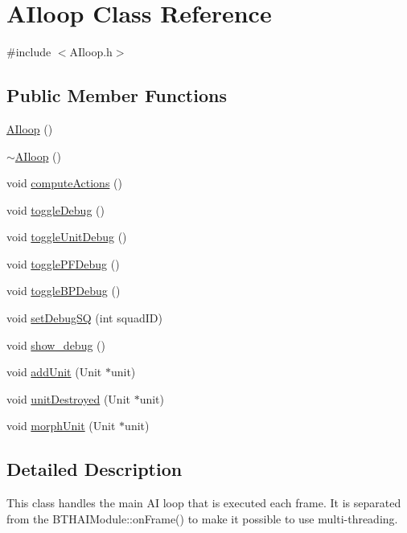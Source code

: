 \hypertarget{class_a_iloop}{\section{A\-Iloop Class Reference}
\label{class_a_iloop}
}


{\ttfamily \#include $<$A\-Iloop.\-h$>$}

\subsection*{Public Member Functions}
\begin{DoxyCompactItemize}
\item 
\hyperlink{class_a_iloop_a20217dd1458618fe080f78e51341dae4}{A\-Iloop} ()
\item 
\hyperlink{class_a_iloop_a8bc15ee25c29beeca460f7682f62d69a}{$\sim$\-A\-Iloop} ()
\item 
void \hyperlink{class_a_iloop_a801c656f08b869162aada7ea07acee7c}{compute\-Actions} ()
\item 
void \hyperlink{class_a_iloop_afefb108f23a44fb3d3476980f200bec7}{toggle\-Debug} ()
\item 
void \hyperlink{class_a_iloop_a7b3a52d22b2327b9a40b1dcbcbf47097}{toggle\-Unit\-Debug} ()
\item 
void \hyperlink{class_a_iloop_a1c37bca877bb6e97468076e4256763d1}{toggle\-P\-F\-Debug} ()
\item 
void \hyperlink{class_a_iloop_a770c5331543570b3554688af7d85099b}{toggle\-B\-P\-Debug} ()
\item 
void \hyperlink{class_a_iloop_a68a5eb0b37ed3bb02e02f39bc31a953e}{set\-Debug\-S\-Q} (int squad\-I\-D)
\item 
void \hyperlink{class_a_iloop_ad7fa805bcc3cb770b3c862780dd26c07}{show\-\_\-debug} ()
\item 
void \hyperlink{class_a_iloop_a27e674d2b42ab12f7b444a21619c0fb1}{add\-Unit} (Unit $\ast$unit)
\item 
void \hyperlink{class_a_iloop_a29a2d542b7ea41632e6f1a80d5265e59}{unit\-Destroyed} (Unit $\ast$unit)
\item 
void \hyperlink{class_a_iloop_a09f7cb36c4c29d91da1de12170bd208c}{morph\-Unit} (Unit $\ast$unit)
\end{DoxyCompactItemize}


\subsection{Detailed Description}
This class handles the main A\-I loop that is executed each frame. It is separated from the B\-T\-H\-A\-I\-Module\-::on\-Frame() to make it possible to use multi-\/threading.


